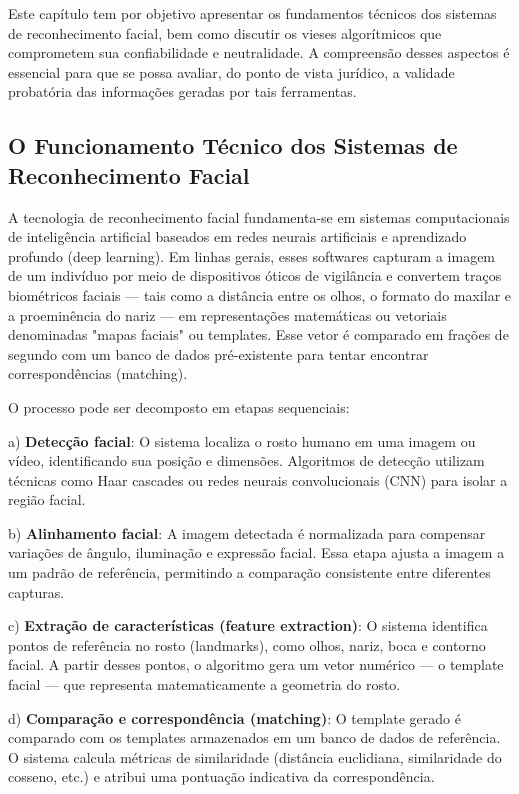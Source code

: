 \documentclass[12pt,a4paper]{article}
\begin{document}
Este capítulo tem por objetivo apresentar os fundamentos técnicos dos sistemas de reconhecimento facial, bem como discutir os vieses algorítmicos que comprometem sua confiabilidade e neutralidade. A compreensão desses aspectos é essencial para que se possa avaliar, do ponto de vista jurídico, a validade probatória das informações geradas por tais ferramentas.

\subsection{O Funcionamento Técnico dos Sistemas de Reconhecimento Facial}

A tecnologia de reconhecimento facial fundamenta-se em sistemas computacionais de inteligência artificial baseados em redes neurais artificiais e aprendizado profundo (deep learning). Em linhas gerais, esses softwares capturam a imagem de um indivíduo por meio de dispositivos óticos de vigilância e convertem traços biométricos faciais --- tais como a distância entre os olhos, o formato do maxilar e a proeminência do nariz --- em representações matemáticas ou vetoriais denominadas "mapas faciais" ou templates. Esse vetor é comparado em frações de segundo com um banco de dados pré-existente para tentar encontrar correspondências (matching).

O processo pode ser decomposto em etapas sequenciais:

a) \textbf{Detecção facial}: O sistema localiza o rosto humano em uma imagem ou vídeo, identificando sua posição e dimensões. Algoritmos de detecção utilizam técnicas como Haar cascades ou redes neurais convolucionais (CNN) para isolar a região facial.

b) \textbf{Alinhamento facial}: A imagem detectada é normalizada para compensar variações de ângulo, iluminação e expressão facial. Essa etapa ajusta a imagem a um padrão de referência, permitindo a comparação consistente entre diferentes capturas.

c) \textbf{Extração de características (feature extraction)}: O sistema identifica pontos de referência no rosto (landmarks), como olhos, nariz, boca e contorno facial. A partir desses pontos, o algoritmo gera um vetor numérico --- o template facial --- que representa matematicamente a geometria do rosto.

d) \textbf{Comparação e correspondência (matching)}: O template gerado é comparado com os templates armazenados em um banco de dados de referência. O sistema calcula métricas de similaridade (distância euclidiana, similaridade do cosseno, etc.) e atribui uma pontuação indicativa da correspondência.
\end{document}
